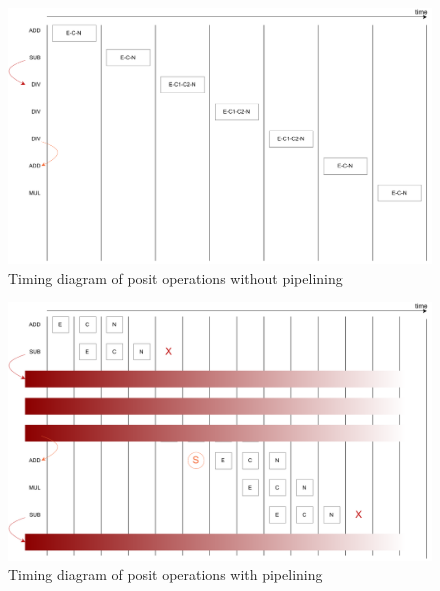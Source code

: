 \begin{figure}
    \centering
    \includegraphics[width=\textwidth]{figures/pipeline_ops_diagram1.pdf}
    \caption{Timing diagram of posit operations without pipelining}
    \label{fig:timing_diagram_4_stagesdiv_3stagesothers_without_pipelining}
\end{figure}
\begin{figure}
    \centering
    \includegraphics[width=\textwidth]{figures/pipeline_ops_diagram2.pdf}
    \caption{Timing diagram of posit operations with pipelining}
    \label{fig:timing_diagram_4_stagesdiv_3stagesothers_with_pipelining}
\end{figure}


